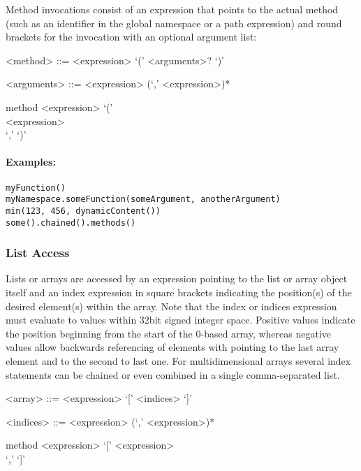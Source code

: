 \documentclass[11pt,a4paper]{article}
\begin{document}
Method invocations consist of an expression that points to the actual method (such as an identifier in the global namespace or a path expression) and round brackets for the invocation with an optional argument list:

\begin{gram}
	\label{gram:method-invocation}
	\begin{grammar}	
		<method> ::= <expression> `(' <arguments>? `)'
		
		<arguments> ::= <expression> (`,' <expression>)*	
	\end{grammar}
	\diagsep
	
	\begin{rrdiag*}{method}
		<expression> `(' \sst \\ \srp <expression> \\ `,' \erp \est `)'
	\end{rrdiag*}
\end{gram}

\paragraph{Examples:}

\begin{Verbatim}[samepage=true]
myFunction()
myNamespace.someFunction(someArgument, anotherArgument)
min(123, 456, dynamicContent())
some().chained().methods()
\end{Verbatim}

\subsubsection{List Access}
\label{sec:list-access}

Lists or arrays are accessed by an expression pointing to the list or array object itself and an index expression in square brackets indicating the position(s) of the desired element(s) within the array. Note that the index or indices expression must evaluate to values within 32bit signed integer space. Positive values indicate the position beginning from the start of the 0-based array, whereas negative values allow backwards referencing of elements with  pointing to the last array element and  to the second to last one. For multidimensional arrays several index statements can be chained or even combined in a single comma-separated list.

\begin{gram}
	\label{gram:list-access}
	\begin{grammar}	
		<array> ::= <expression> `[' <indices> `]'
		
		<indices> ::= <expression> (`,' <expression>)*	
	\end{grammar}
	\diagsep
	
	\begin{rrdiag*}{method}
		<expression> `[' \srp <expression> \\ `,' \erp `]'
	\end{rrdiag*}
\end{gram}
\end{document}
